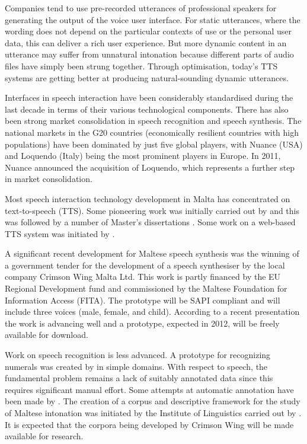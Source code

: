 \documentclass[]{../../metanetpaper}
\begin{document}
\begin{multicols}{2}
Companies tend to use pre-recorded utterances of professional speakers for generating the output of the voice user interface. For static utterances, where the wording does not depend on the particular contexts of use or the personal user data, this can deliver a rich user experience. But more dynamic content in an utterance may suffer from unnatural intonation because different parts of audio files have simply been strung together. Through optimisation, today’s TTS systems are getting better at producing natural-sounding dynamic utterances.


Interfaces in speech interaction have been considerably standardised during the last decade in terms of their various technological components. There has also been strong market consolidation in speech recognition and speech synthesis. The national markets in the G20 countries (economically resilient countries with high populations) have been dominated by just five global players, with Nuance (USA) and Loquendo (Italy) being the most prominent players in Europe. In 2011, Nuance announced the acquisition of Loquendo, which represents a further step in market consolidation.

Most speech interaction technology development in Malta has concentrated on text-to-speech (TTS). Some pioneering work was initially carried out by \cite{Micallef:1997} and this was followed by a number of Master’s dissertations \cite{Farrugia:2005}. Some work on a web-based TTS system was initiated by \cite{Buhagiar-Micallef:2008}.

A significant recent development for Maltese speech synthesis was the winning of a government tender for the development of a speech synthesiser by the local company Crimson Wing Malta Ltd. This work is partly financed by the EU Regional Development fund and commissioned by the Maltese Foundation for Information Access (FITA). The prototype will be SAPI compliant and will include three voices (male, female, and child). According to a recent presentation \cite{Borg-et-al:2011} the work is advancing well and a prototype, expected in 2012, will be freely available for download. 

Work on speech recognition is less advanced. A prototype for recognizing numerals was created by \cite{Calleja:2002} in simple domains. With respect to speech, the fundamental problem remains a lack of suitably annotated data since this requires significant manual effort. Some attempts at automatic annotation have been made by \cite{Psaila:2008}. The creation of a corpus and descriptive framework for the study of Maltese intonation was initiated by the Institute of Linguistics carried out by \cite{Vella-Farrugia:2006}. It is expected that the corpora being developed by Crimson Wing will be made available for research.


\end{multicols}
\end{document}
